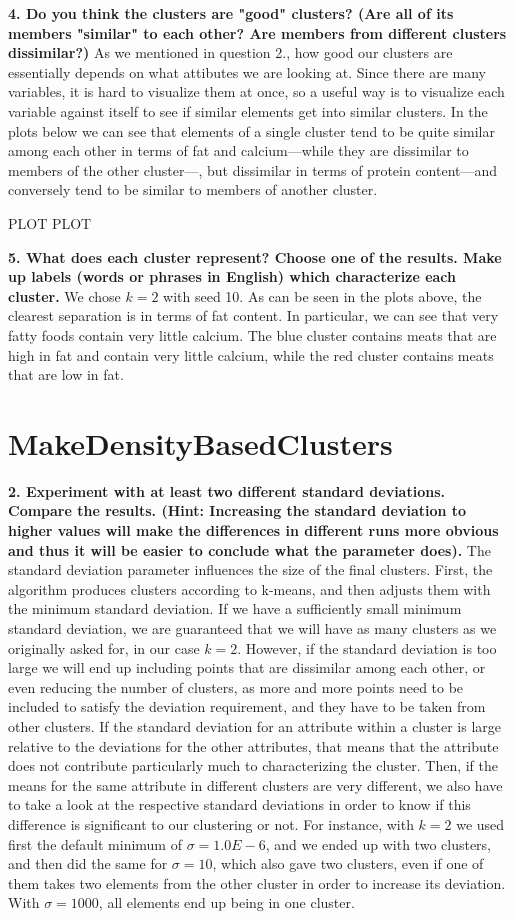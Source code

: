 \documentclass[]{article}
\begin{document}
\noindent\textbf{4. Do you think the clusters are "good" clusters? (Are all of its members "similar" to each other? Are members from different clusters dissimilar?)}
As we mentioned in question 2., how good our clusters are essentially depends on what attibutes we are looking at. Since there are many variables, it is hard to visualize them at once, so a useful way is to visualize each variable against itself to see if similar elements get into similar clusters. In the plots below we can see that elements of a single cluster tend to be quite similar among each other in terms of fat and calcium---while they are dissimilar to members of the other cluster---, but dissimilar in terms of protein content---and conversely tend to be similar to members of another cluster.

PLOT PLOT 

\noindent\textbf{5. What does each cluster represent? Choose one of the results. Make up labels (words or phrases in English) which characterize each cluster.}
We chose $k=2$ with seed 10. As can be seen in the plots above, the clearest separation is in terms of fat content. In particular, we can see that very fatty foods contain very little calcium. The blue cluster contains meats that are high in fat and contain very little calcium, while the red cluster contains meats that are low in fat.


\section{MakeDensityBasedClusters}
\textbf{2. Experiment with at least two different standard deviations. Compare the results. (Hint: Increasing the standard deviation to higher values will make the differences in different runs more obvious and thus it will be easier to conclude what the parameter does).} 
The standard deviation parameter influences the size of the final clusters. First, the algorithm produces clusters according to k-means, and then adjusts them with the minimum standard deviation. If we have a sufficiently small minimum standard deviation, we are guaranteed that we will have as many clusters as we originally asked for, in our case $k=2$. However, if the standard deviation is too large we will end up including points that are dissimilar among each other, or even reducing the number of clusters, as more and more points need to be included to satisfy the deviation requirement, and they have to be taken from other clusters. If the standard deviation for an attribute within a cluster is large relative to the deviations for the other attributes, that means that the attribute does not contribute particularly much to characterizing the cluster. Then, if the means for the same attribute in different clusters are very different, we also have to take a look at the respective standard deviations in order to know if this difference is significant to our clustering or not. For instance, with $k=2$ we used first the default minimum of $\sigma=1.0E-6$, and we ended up with two clusters, and then did the same for $\sigma=10$, which also gave two clusters, even if one of them takes two elements from the other cluster in order to increase its deviation. With $\sigma=1000$, all elements end up being in one cluster.
\end{document}
